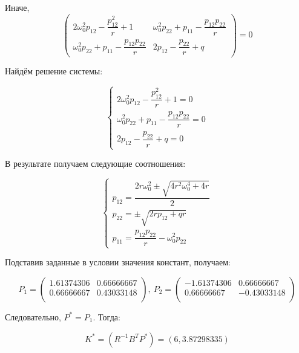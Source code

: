 \documentclass[12pt]{article}
\begin{document}
Иначе,
\begin{equation}
 \begin{pmatrix}
  2\omega_0^2p_{12} - \dfrac{p_{12}^2}{r} + 1 &
  \omega_0^2p_{22} + p_{11} - \dfrac{p_{12}p_{22}}{r} \\
  \omega_0^2p_{22} + p_{11} - \dfrac{p_{12}p_{22}}{r} &
  2p_{12} - \dfrac{p_{22}}{r} + q
 \end{pmatrix}
  = 0
\end{equation}

Найдём решение системы:

\begin{equation}
 \begin{cases}
  2\omega_0^2p_{12} - \dfrac{p_{12}^2}{r} + 1 = 0\\
  \omega_0^2p_{22} + p_{11} - \dfrac{p_{12}p_{22}}{r} = 0 \\
  2p_{12} - \dfrac{p_{22}}{r} + q = 0
 \end{cases}
\end{equation}

В результате получаем следующие соотношения:

\begin{equation}
 \begin{cases}
  p_{12} = \dfrac{2r\omega_0^2 \pm \sqrt{4r^2\omega_0^4 + 4r}}{2}\\
  p_{22} = \pm \sqrt{2rp_{12} + qr} \\
  p_{11} = \dfrac{p_{12}p_{22}}{r} - \omega_0^2p_{22}
 \end{cases}
\end{equation}

Подставив заданные в условии значения констант, получаем:

\begin{equation}
 P_1 = 
 \begin{pmatrix}
  1.61374306 & 0.66666667 \\
  0.66666667 & 0.43033148 \\
 \end{pmatrix}, \
 P_2 = 
 \begin{pmatrix}
  -1.61374306 & 0.66666667 \\
  0.66666667 & -0.43033148 \\
 \end{pmatrix}
\end{equation}

Следовательно, $P^* = P_1$. Тогда:

\begin{equation}
 K^* = (R^{-1}B^TP^*) = (6, 3.87298335)
\end{equation}
\end{document}
